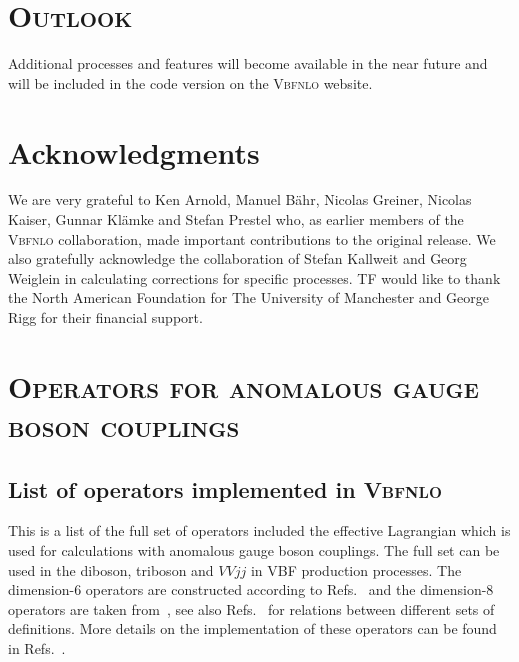 \documentclass[english,12pt]{article}
\begin{document}
\newpage

\section{\textsc{Outlook}}

Additional processes and features will become available in the near future and will be included in the code version on the \textsc{Vbfnlo} website.  


\section*{Acknowledgments}

We are very grateful to Ken Arnold, Manuel B\"ahr, Nicolas Greiner, Nicolas
Kaiser, Gunnar Kl\"amke and Stefan Prestel who, as earlier members of the
\textsc{Vbfnlo} collaboration, made important contributions to the original
release.  We also gratefully acknowledge the collaboration of Stefan Kallweit
and Georg Weiglein in calculating corrections for specific processes.  
TF would like to thank the North American Foundation for The University of
Manchester and George Rigg for their financial support.



\newpage

\appendix

\section{\textsc{Operators for anomalous gauge boson couplings}}

\subsection{List of operators implemented in \textsc{Vbfnlo}}
\label{listofoperators}

This is a list of the full set of operators included the effective Lagrangian
which is used for calculations with anomalous gauge boson couplings.
The full set can be used in the diboson, triboson and $VVjj$ in VBF production
processes.
The dimension-6 operators are constructed according to Refs.~\cite{Hagiwara:1993qt,Hagiwara:1993ck} and
the dimension-8 operators are taken from~\cite{Eboli:2006wa,Eboli:2016kko}, see
also Refs.~\cite{Degrande:2013rea,Rauch:2016pai} for relations between
different sets of definitions.
More details on the implementation of these operators can be found in 
Refs.~\cite{anomWW, anomVVV, anomVBF}.
\end{document}
